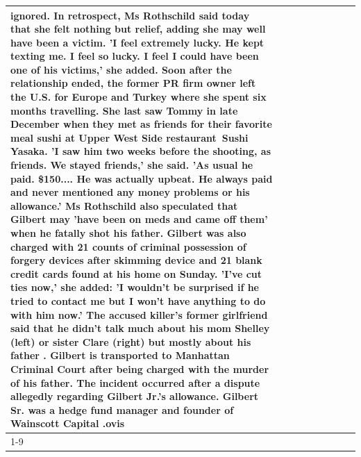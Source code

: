 \begin{table}[H]
\begin{tabular}{lllrlllll}
ignored. In retrospect, Ms Rothschild said today that she felt nothing but relief, adding she may well have been a victim. 'I feel extremely lucky. He kept texting me. I feel so lucky. I feel I could have been one of his victims,' she added. Soon after the relationship ended, the former PR firm owner left the U.S. for Europe and Turkey where she spent six months  travelling. She last saw Tommy in late December when they met as friends for their favorite meal sushi at Upper West Side restaurant Sushi Yasaka. 'I saw him two weeks before the shooting, as friends. We stayed friends,' she said. 'As usual he paid. \$150.... He was actually upbeat. He always paid and never mentioned any money problems or his allowance.' Ms Rothschild also speculated that Gilbert may 'have been on meds and came off them' when he fatally shot his father. Gilbert was also charged with 21 counts of criminal possession of forgery devices after skimming device and 21 blank credit cards found at his home on Sunday. 'I've cut ties now,' she added: 'I wouldn’t be surprised if he tried to contact me but I won’t have anything to do with him now.' The accused killer's former girlfriend said that he didn't talk much about his mom Shelley (left) or sister Clare (right) but mostly about his father . Gilbert is transported to Manhattan Criminal Court  after being charged with the murder of his father. The incident occurred after a dispute allegedly regarding Gilbert Jr.'s allowance. Gilbert Sr. was a hedge fund manager and founder of Wainscott Capital .ovis \\
\cline{1-9} \cline{2-9}

\end{tabular}
\end{table}
